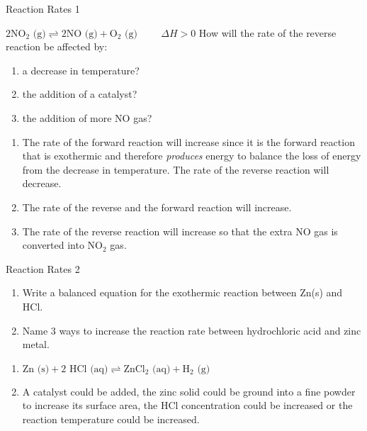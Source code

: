 \begin{wex}{Reaction Rates 1}{
$2\text{NO}_{2}\text{ (g)}\rightleftharpoons 2\text{NO (g)} + \text{O}_{2}\text{ (g)} \hspace{1cm} \Delta H > 0$
How will the rate of the reverse reaction be affected by:
\begin{enumerate}
  \item a decrease in temperature?
  \item the addition of a catalyst?
  \item the addition of more NO gas?
\end{enumerate}}
  {
\begin{enumerate}
  \item         The rate of the forward reaction will increase since it is the forward reaction that is exothermic and therefore \textit{produces} energy to balance the loss of energy from the decrease in temperature. The rate of the reverse reaction will decrease. 
 
  \item The rate of the reverse and the forward reaction will increase.
  \item         The rate of the reverse reaction
  will increase so that the extra NO gas is converted into NO$_{2}$ gas. 
\end{enumerate}}  
\end{wex}

\begin{wex}{Reaction Rates 2}{
\begin{enumerate}
  \item Write a balanced equation for the exothermic reaction between
  Zn(s) and HCl. 
  \item Name 3 ways to increase the reaction rate between hydrochloric
  acid and zinc metal.     
\end{enumerate}}  
   {
   \begin{enumerate}
     \item $\text{Zn (s)} + 2\text{ HCl (aq)} \rightleftharpoons  \text{ZnCl}_{2}\text{ (aq)}+ \text{H}_{2}\text{ (g)}$
     \item A catalyst could be added, the zinc solid could be ground
     into a fine powder to increase its surface area, the HCl
     concentration could be increased or the reaction temperature
     could be increased.        
   \end{enumerate}}  
\end{wex}  

